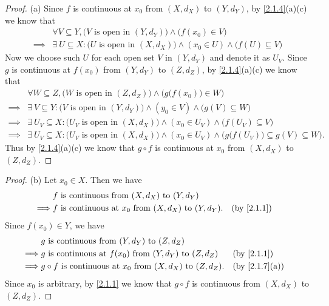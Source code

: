 \begin{proof}{(a)}
  Since \(f\) is continuous at \(x_0\) from \((X, d_X)\) to \((Y, d_Y)\), by \cref{2.1.4}(a)(c) we know that
  \begin{align*}
             & \forall V \subseteq Y, \big(V \text{ is open in } (Y, d_Y)\big) \land \big(f(x_0) \in V\big)                         \\
    \implies & \exists\ U \subseteq X : \big(U \text{ is open in } (X, d_X)\big) \land (x_0 \in U) \land \big(f(U) \subseteq V\big)
  \end{align*}
  Now we choose such \(U\) for each open set \(V\) in \((Y, d_Y)\) and denote it as \(U_V\).
  Since \(g\) is continuous at \(f(x_0)\) from \((Y, d_Y)\) to \((Z, d_Z)\), by \cref{2.1.4}(a)(c) we know that
  \begin{align*}
             & \forall W \subseteq Z, \big(W \text{ is open in } (Z, d_Z)\big) \land \Big(g\big(f(x_0)\big) \in W\Big)                                                 \\
    \implies & \exists\ V \subseteq Y : \big(V \text{ is open in } (Y, d_Y)\big) \land (y_0 \in V) \land \big(g(V) \subseteq W\big)                                    \\
    \implies & \exists\ U_V \subseteq X : \big(U_V \text{ is open in } (X, d_X)\big) \land (x_0 \in U_V) \land \big(f(U_V) \subseteq V\big)                            \\
    \implies & \exists\ U_V \subseteq X : \big(U_V \text{ is open in } (X, d_X)\big) \land (x_0 \in U_V) \land \Big(g\big(f(U_V)\big) \subseteq g(V) \subseteq W\Big).
  \end{align*}
  Thus by \cref{2.1.4}(a)(c) we know that \(g \circ f\) is continuous at \(x_0\) from \((X, d_X)\) to \((Z, d_Z)\).
\end{proof}

\begin{proof}{(b)}
  Let \(x_0 \in X\).
  Then we have
  \begin{align*}
             & f \text{ is continuous from } (X, d_X) \text{ to } (Y, d_Y)                                                \\
    \implies & f \text{ is continuous at } x_0 \text{ from } (X, d_X) \text{ to } (Y, d_Y). &  & \text{(by \cref{2.1.1})}
  \end{align*}
  Since \(f(x_0) \in Y\), we have
  \begin{align*}
             & g \text{ is continuous from } (Y, d_Y) \text{ to } (Z, d_Z)                                                           \\
    \implies & g \text{ is continuous at } f(x_0) \text{ from } (Y, d_Y) \text{ to } (Z, d_Z)       &  & \text{(by \cref{2.1.1})}    \\
    \implies & g \circ f \text{ is continuous at } x_0 \text{ from } (X, d_X) \text{ to } (Z, d_Z). &  & \text{(by \cref{2.1.7}(a))}
  \end{align*}
  Since \(x_0\) is arbitrary, by \cref{2.1.1} we know that \(g \circ f\) is continuous from \((X, d_X)\) to \((Z, d_Z)\).
\end{proof}


